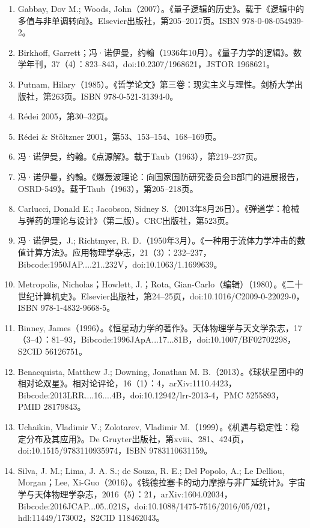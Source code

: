 \begin{enumerate}
\item Gabbay, Dov M.; Woods, John（2007）。《量子逻辑的历史》。载于《逻辑中的多值与非单调转向》。Elsevier出版社，第205–2017页。ISBN 978-0-08-054939-2。  
\item Birkhoff, Garrett；冯·诺伊曼，约翰（1936年10月）。《量子力学的逻辑》。数学年刊，37（4）：823–843，doi:10.2307/1968621，JSTOR 1968621。  
\item Putnam, Hilary（1985）。《哲学论文》第三卷：现实主义与理性。剑桥大学出版社，第263页。ISBN 978-0-521-31394-0。  
\item Rédei 2005，第30–32页。  
\item Rédei & Stöltzner 2001，第53、153–154、168–169页。  
\item 冯·诺伊曼，约翰。《点源解》。载于Taub（1963），第219–237页。  
\item 冯·诺伊曼，约翰。《爆轰波理论：向国家国防研究委员会B部门的进展报告，OSRD-549》。载于Taub（1963），第205–218页。  
\item Carlucci, Donald E.; Jacobson, Sidney S.（2013年8月26日）。《弹道学：枪械与弹药的理论与设计》（第二版）。CRC出版社，第523页。  
\item 冯·诺伊曼，J.; Richtmyer, R. D.（1950年3月）。《一种用于流体力学冲击的数值计算方法》。应用物理学杂志，21（3）：232–237，Bibcode:1950JAP....21..232V，doi:10.1063/1.1699639。  
\item Metropolis, Nicholas；Howlett, J.；Rota, Gian-Carlo（编辑）（1980）。《二十世纪计算机史》。Elsevier出版社，第24–25页，doi:10.1016/C2009-0-22029-0，ISBN 978-1-4832-9668-5。  
\item Binney, James（1996）。《恒星动力学的著作》。天体物理学与天文学杂志，17（3–4）：81–93，Bibcode:1996JApA...17...81B，doi:10.1007/BF02702298，S2CID 56126751。  
\item Benacquista, Matthew J.; Downing, Jonathan M. B.（2013）。《球状星团中的相对论双星》。相对论评论，16（1）：4，arXiv:1110.4423，Bibcode:2013LRR....16....4B，doi:10.12942/lrr-2013-4，PMC 5255893，PMID 28179843。
\item Uchaikin, Vladimir V.; Zolotarev, Vladimir M.（1999）。《机遇与稳定性：稳定分布及其应用》。De Gruyter出版社，第xviii、281、424页，doi:10.1515/9783110935974，ISBN 9783110631159。  
\item Silva, J. M.; Lima, J. A. S.; de Souza, R. E.; Del Popolo, A.; Le Delliou, Morgan；Lee, Xi-Guo（2016）。《钱德拉塞卡的动力摩擦与非广延统计》。宇宙学与天体物理学杂志，2016（5）：21，arXiv:1604.02034，Bibcode:2016JCAP...05..021S，doi:10.1088/1475-7516/2016/05/021，hdl:11449/173002，S2CID 118462043。  

\end{enumerate}
